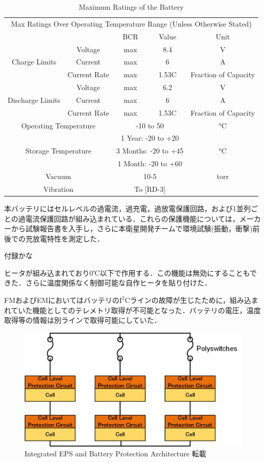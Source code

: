 \begin{table}
	\caption{Maximum Ratings of the Battery}
	\label{table3_1_bat_max}
	\centering
	\begin{tabular}{ccccc}
		\hline \hline
		\multicolumn{5}{c}{Max Ratings Over Operating Temperature Range (Unless Otherwise Stated)}\\
		&&BCR  & Value  &  Unit  \\
		\hline
		\multirow{3}{*}{Charge Limits}&Voltage&max&8.4&V\\
		&Current&max&6&A\\
		&Current Rate& max &1.53C &Fraction of Capacity\\
		\hline
		\multirow{3}{*}{Discharge Limits}&Voltage&max&6.2&V\\
		&Current&max&6&A\\
		&Current Rate& max &1.53C &Fraction of Capacity\\
		\hline
		\multicolumn{2}{c}{Operating Temperature}&\multicolumn{2}{c}{ -10 to 50} & °C\\
		\multicolumn{2}{c}{\multirow{3}{*}{Storage Temperature}}&\multicolumn{2}{c}{1 Year: -20 to +20}&\multirow{3}{*}{°C}\\
		&&\multicolumn{2}{c}{3 Months: -20 to +45}&\\
		&&\multicolumn{2}{c}{1 Month: -20 to +60}&\\
		\multicolumn{2}{c}{Vacuum}&\multicolumn{2}{c}{10-5}&torr\\
		\multicolumn{2}{c}{Vibration}&\multicolumn{2}{c}{To [RD-3]}\\
		\hline
	\end{tabular}
\end{table}
	




本バッテリにはセルレベルの過電流，過充電，過放電保護回路，および1並列ごとの過電流保護回路が組み込まれている．これらの保護機能については，メーカーから試験報告書を入手し，さらに本衛星開発チームで環境試験(振動，衝撃)前後での充放電特性を測定した．

付録かな

ヒータが組み込まれており0℃以下で作用する．この機能は無効にすることもできた．さらに温度関係なく制御可能な自作ヒータを貼り付けた．

FMおよびEMにおいてはバッテリの$\mathrm{I^{2}C}$ラインの故障が生じたために，組み込まれていた機能としてのテレメトリ取得が不可能となった．バッテリの電圧，温度取得等の情報は別ラインで取得可能にしていた．


\begin{figure}[htbp]
	\begin{center}
		\includegraphics[width=0.5\linewidth]{./03/fig/BAT.png}
		\caption{Integrated EPS and Battery Protection Architecture 転載}
		\label{mir}
	\end{center}
\end{figure}

